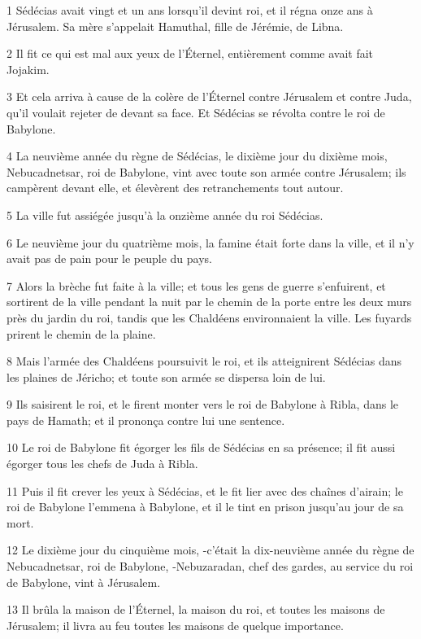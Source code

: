 \par 1 Sédécias avait vingt et un ans lorsqu'il devint roi, et il régna onze ans à Jérusalem. Sa mère s'appelait Hamuthal, fille de Jérémie, de Libna.
\par 2 Il fit ce qui est mal aux yeux de l'Éternel, entièrement comme avait fait Jojakim.
\par 3 Et cela arriva à cause de la colère de l'Éternel contre Jérusalem et contre Juda, qu'il voulait rejeter de devant sa face. Et Sédécias se révolta contre le roi de Babylone.
\par 4 La neuvième année du règne de Sédécias, le dixième jour du dixième mois, Nebucadnetsar, roi de Babylone, vint avec toute son armée contre Jérusalem; ils campèrent devant elle, et élevèrent des retranchements tout autour.
\par 5 La ville fut assiégée jusqu'à la onzième année du roi Sédécias.
\par 6 Le neuvième jour du quatrième mois, la famine était forte dans la ville, et il n'y avait pas de pain pour le peuple du pays.
\par 7 Alors la brèche fut faite à la ville; et tous les gens de guerre s'enfuirent, et sortirent de la ville pendant la nuit par le chemin de la porte entre les deux murs près du jardin du roi, tandis que les Chaldéens environnaient la ville. Les fuyards prirent le chemin de la plaine.
\par 8 Mais l'armée des Chaldéens poursuivit le roi, et ils atteignirent Sédécias dans les plaines de Jéricho; et toute son armée se dispersa loin de lui.
\par 9 Ils saisirent le roi, et le firent monter vers le roi de Babylone à Ribla, dans le pays de Hamath; et il prononça contre lui une sentence.
\par 10 Le roi de Babylone fit égorger les fils de Sédécias en sa présence; il fit aussi égorger tous les chefs de Juda à Ribla.
\par 11 Puis il fit crever les yeux à Sédécias, et le fit lier avec des chaînes d'airain; le roi de Babylone l'emmena à Babylone, et il le tint en prison jusqu'au jour de sa mort.
\par 12 Le dixième jour du cinquième mois, -c'était la dix-neuvième année du règne de Nebucadnetsar, roi de Babylone, -Nebuzaradan, chef des gardes, au service du roi de Babylone, vint à Jérusalem.
\par 13 Il brûla la maison de l'Éternel, la maison du roi, et toutes les maisons de Jérusalem; il livra au feu toutes les maisons de quelque importance.
